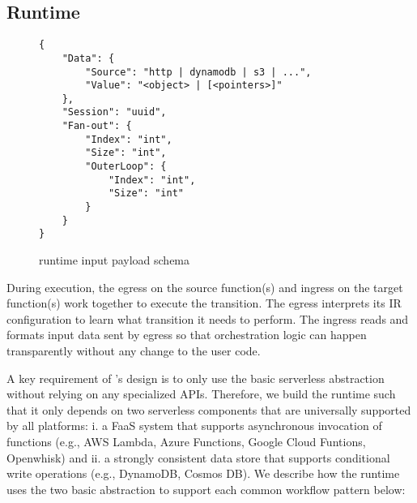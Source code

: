 \subsection{\name{} Runtime}\label{sec:runtime}


\begin{figure}[]
    \begin{verbatim}
{
    "Data": {
        "Source": "http | dynamodb | s3 | ...",
        "Value": "<object> | [<pointers>]"
    },
    "Session": "uuid",
    "Fan-out": {
        "Index": "int",
        "Size": "int",
        "OuterLoop": {
            "Index": "int",
            "Size": "int"
        }
    }
}
    \end{verbatim}
    \caption{\name{} runtime input payload schema}
    \label{fig:input-format}
\end{figure}

During execution, the egress on the source function(s) and ingress on the
target function(s) work together to execute the transition. The egress
interprets its IR configuration to learn what transition it needs to perform.
The ingress reads and formats input data sent by egress so that
\name{} orchestration logic can happen transparently without any change to the
user code.

A key requirement of \name{}'s design is to only use the basic serverless
abstraction without relying on any specialized APIs. Therefore, we build the
runtime such that it only depends on two serverless components that are
universally supported by all platforms: i. a FaaS system that supports 
asynchronous invocation of functions (e.g., AWS Lambda, Azure Functions,
Google Cloud Funtions, Openwhisk) and ii. a strongly consistent data store
that supports conditional write operations (e.g., DynamoDB, Cosmos DB).
We describe how the \name{} runtime uses the two basic abstraction to support
each common workflow pattern below:

